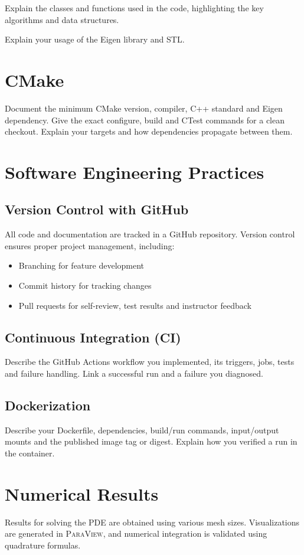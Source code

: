 \documentclass[11pt,a4paper]{article}
\begin{document}
Explain the classes and functions used in the code, highlighting the key algorithms and data structures.

Explain your usage of the Eigen library and STL.

\section{CMake}
\begin{csminote}
Document the minimum CMake version, compiler, C++ standard and Eigen dependency.
Give the exact configure, build and CTest commands for a clean checkout.
Explain your targets and how dependencies propagate between them.
\end{csminote}


\section{Software Engineering Practices}
\label{sec:software_practices}
\subsection{Version Control with GitHub}
All code and documentation are tracked in a GitHub repository. Version control ensures proper project management, including:
\begin{itemize}
    \item Branching for feature development
    \item Commit history for tracking changes
    \item Pull requests for self-review, test results and instructor feedback
\end{itemize}

\subsection{Continuous Integration (CI)}
Describe the GitHub Actions workflow you implemented, its triggers, jobs, tests and failure handling. Link a successful run and a failure you diagnosed.

\subsection{Dockerization}
Describe your Dockerfile, dependencies, build/run commands, input/output mounts and the published image tag or digest. Explain how you verified a run in the container.

\section{Numerical Results}
\label{sec:numerical_results}
Results for solving the PDE are obtained using various mesh sizes. Visualizations are generated in \textsc{ParaView}, and numerical integration is validated using quadrature formulas.
\end{document}
